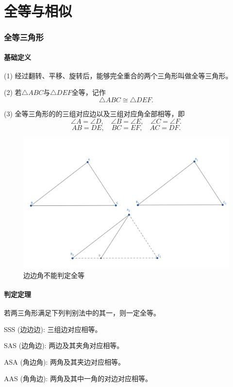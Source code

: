 \part{全等与相似}
\section{全等三角形}
\subsection{基础定义}
\begin{definition}[全等关系]
    (1) 经过翻转、平移、旋转后，能够完全重合的两个三角形叫做全等三角形。
    
    (2) 若$\triangle ABC$与$\triangle DEF$全等，记作
    $$\triangle ABC \cong \triangle DEF.$$

    (3) 全等三角形的的三组对应边以及三组对应角全部相等，即
    $$\angle A = \angle D, \quad \angle B = \angle E, \quad \angle C = \angle F.$$
    $$AB = DE, \quad BC =EF, \quad AC=DF.$$
\end{definition}

\begin{figure}[H]
    \centering
    \includegraphics[width=\linewidth]{figures/全等三角形.png}
    \caption{边边角不能判定全等}
\end{figure}


\subsection{判定定理}
\begin{theorem}[全等三角形判定定理]
    若两三角形满足下列判别法中的其一，则一定全等。
    
    SSS (边边边): 三组边对应相等。

    SAS (边角边): 两边及其夹角对应相等。

    ASA (角边角): 两角及其夹边对应相等。

    AAS (角角边): 两角及其中一角的对边对应相等。
\end{theorem}

